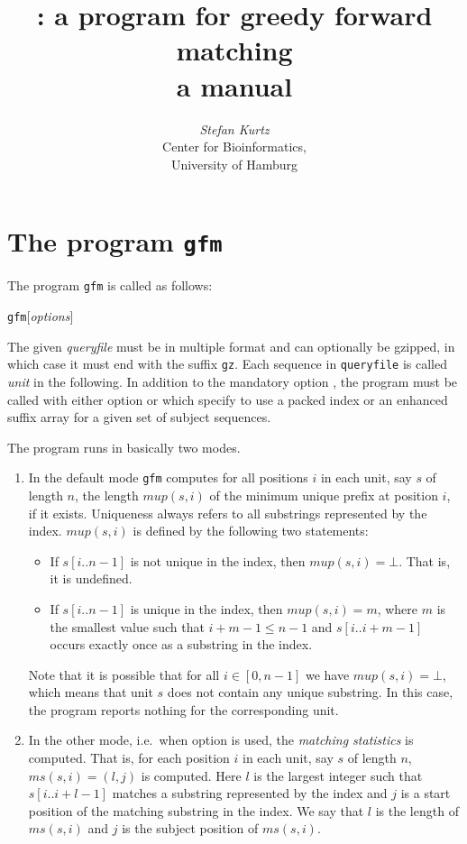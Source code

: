 \documentclass[12pt]{article}
\title{\GFM: a program for greedy forward matching\\
a manual}
\author{\begin{tabular}{c}
         \textit{Stefan Kurtz}\\
         Center for Bioinformatics,\\
         University of Hamburg
        \end{tabular}}
\newcommand{\GFM}[0]{\texttt{gfm}\xspace}
\newcommand{\Mup}[1]{\mathit{mup(s,#1)}}
\newcommand{\MS}[1]{\mathit{ms(s,#1)}}
\newcommand{\Substring}[3]{#1[#2..#3]}
\begin{document}
\maketitle

\section{The program \GFM}

The program \GFM is called as follows:
\par
\noindent\GFM [\textit{options}]  
\par
The given \textit{queryfile} must be in multiple 
\Fasta format and can optionally be gzipped, in which case it must end 
with the suffix \texttt{gz}.
Each sequence in \texttt{queryfile} is called \textit{unit} in the following.
In addition to the mandatory option , the program
must be called with either option  or 
which specify to use a packed index or an enhanced suffix array for 
a given set of subject sequences.

The program runs in basically two modes. 

\begin{enumerate}
\item
In the default mode \GFM computes
for all positions \(i\) in each unit, say \(s\) of length
\(n\), the length \(\Mup{i}\) of the minimum unique prefix 
at position \(i\), if it exists. Uniqueness always refers to all substrings
represented by the index. \(\Mup{i}\) is defined by the following two 
statements:
\begin{itemize}
\item
If \(\Substring{s}{i}{n-1}\) is not unique in the index, then \(\Mup{i}=\bot\).
That is, it is undefined.
\item
If \(\Substring{s}{i}{n-1}\) is unique in the index, then \(\Mup{i}=m\), where 
\(m\) is the smallest value such that \(i+m-1\leq n-1\) and 
\(\Substring{s}{i}{i+m-1}\) occurs exactly once as a substring in the index.
\end{itemize}
Note that it is possible that for all \(i\in[0,n-1]\) we have 
\(\Mup{i}=\bot\), which means that unit \(s\) does not contain any unique 
substring. In this case, the program reports nothing for the corresponding
unit.
\item
In the other mode, i.e.\ when option  is used, the 
\textit{matching statistics} is computed. That is, for each position \(i\) in 
each unit, say \(s\) of length \(n\), \(\MS{i}=(l,j)\) is computed. Here
\(l\) is the largest integer such that \(\Substring{s}{i}{i+l-1}\) matches
a substring represented by the index and \(j\) is a start position of the
matching substring in the index. We say that \(l\) is the length of \(\MS{i}\)
and \(j\) is the subject position of \(\MS{i}\).
\end{enumerate}
\end{document}
